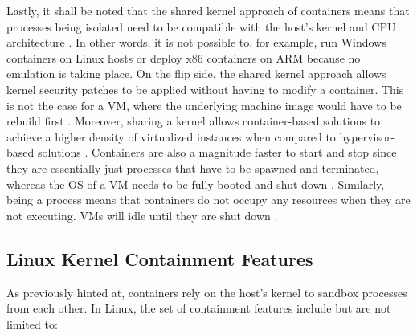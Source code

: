 Lastly, it shall be noted that the shared kernel approach of containers means that processes being isolated need to be compatible with the host's kernel and \acs{CPU} architecture \cite[p.~386]{morabito2015hypervisors} \cite[p.~2]{eder2016hypervisor}. In other words, it is not possible to, for example, run Windows containers on Linux hosts or deploy x86 containers on ARM because no emulation is taking place. On the flip side, the shared kernel approach allows kernel security patches to be applied without having to modify a container. This is not the case for a \acs{VM}, where the underlying machine image would have to be rebuild first \cite[p.~3]{eder2016hypervisor}. Moreover, sharing a kernel allows container-based solutions to achieve a higher density of virtualized instances when compared to hypervisor-based solutions \cite[p.~386]{morabito2015hypervisors} \cite[p.~204]{kang2016container}. Containers are also a magnitude faster to start and stop since they are essentially just processes that have to be spawned and terminated, whereas the \acs{OS} of a \acs{VM} needs to be fully booted and shut down \cite[p.~2]{merkel2014docker} \cite[p.~2]{eder2016hypervisor}. Similarly, being a process means that containers do not occupy any resources when they are not executing. \acsp{VM} will idle until they are shut down \cite[p.~2]{merkel2014docker}.


\subsection{Linux Kernel Containment Features}
\label{sec:linux-kernel-containment-features}

As previously hinted at, containers rely on the host's kernel to sandbox processes from each other. In Linux, the set of containment features include but are not limited to:

